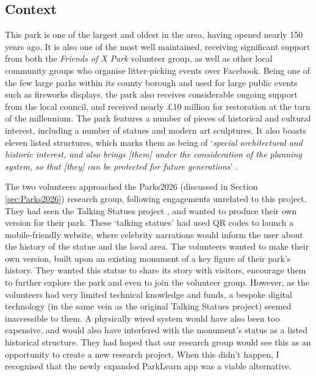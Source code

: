 \subsection{Context}
This park is one of the largest and oldest in the area, having opened nearly 150 years ago. It is also one of the most well maintained, receiving significant support from both the \textit{Friends of X Park} volunteer group, as well as other local community groups who organise litter-picking events over Facebook. Being one of the few large parks within its county borough and used for large public events such as fireworks displays, the park also receives considerable ongoing support from the local council, and received nearly £10 million for restoration at the turn of the millennium. The park features a number of pieces of historical and cultural interest, including a number of statues and modern art sculptures. It also boasts eleven listed structures, which marks them as being of `\textit{special architectural and historic interest, and also brings [them] under the consideration of the planning system, so that [they] can be protected for future generations}' \citep{HistoricEngland2020}. 

The two volunteers approached the Parks2026 (discussed in Section \ref{sec:Parks2026}) research group, following engagements unrelated to this project. They had seen the Talking Statues project \citep{Sing2017}, and wanted to produce their own version for their park. These `talking statues' had used QR codes to launch a mobile-friendly website, where celebrity narrations would inform the user about the history of the statue and the local area. The volunteers wanted to make their own version, built upon an existing monument of a key figure of their park's history. They wanted this statue to share its story with visitors, encourage them to further explore the park and even to join the volunteer group. However, as the volunteers had very limited technical knowledge and funds, a bespoke digital technology (in the same vein as the original Talking Statues project) seemed inaccessible to them. A physically wired system would have also been too expensive, and would also have interfered with the monument’s status as a listed historical structure. They had hoped that our research group would see this as an opportunity to create a new research project. When this didn't happen, I recognised that the newly expanded ParkLearn app was a viable alternative.

